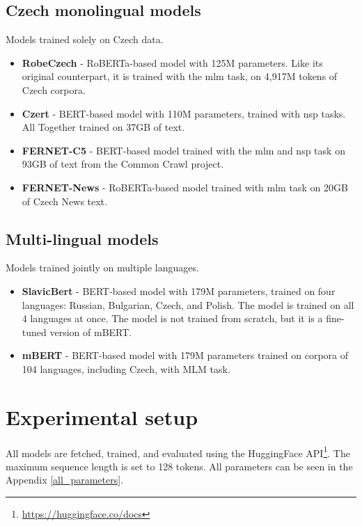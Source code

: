 \subsection{Czech monolingual models}
Models trained solely on Czech data.
\begin{itemize}
    \item \textbf{RobeCzech} \cite{strakarobeczech} - RoBERTa-based model with 125M parameters. Like its original counterpart, it is trained with the \gls{mlm} task, on 4,917M tokens of Czech corpora.
    \item \textbf{Czert} \cite{sido-etal-2021-czert} - BERT-based model with 110M parameters, trained with \gls{nsp} tasks. All Together trained on 37GB of text. 
    \item \textbf{FERNET-C5} \cite{lehevcka2021comparison} - BERT-based model trained with the \gls{mlm} and \gls{nsp} task on 93GB of text from the Common Crawl project.
    \item \textbf{FERNET-News} \cite{lehevcka2021comparison} - RoBERTa-based model trained with \gls{mlm} task on 20GB of Czech News text.
\end{itemize}



\newpage
\subsection{Multi-lingual models}
Models trained jointly on multiple languages.
\begin{itemize}
    \item \textbf{SlavicBert} \cite{arkhipov2019tuning} - BERT-based model with 179M parameters, trained on four languages: Russian, Bulgarian, Czech, and Polish. The model is trained on all 4 languages at once. The model is not trained from scratch, but it is a fine-tuned version of mBERT.
    \item \textbf{mBERT} \cite{devlin2019bert} - BERT-based model with 179M parameters trained on corpora of 104 languages, including Czech, with MLM task.
\end{itemize}




\section{Experimental setup}
All models are fetched, trained, and evaluated using the HuggingFace API\footnote{\url{https://huggingface.co/docs}}. The maximum sequence length is set to 128 tokens. All parameters can be seen in the Appendix \ref{all_parameters}.

